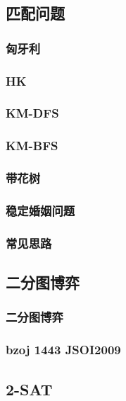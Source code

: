 \documentclass[10pt,a4paper]{article}
\begin{document}
\subsection{匹配问题}
\subsubsection{匈牙利}

\subsubsection{HK}

\subsubsection{KM-DFS}

\subsubsection{KM-BFS}

\subsubsection{带花树}

\subsubsection{稳定婚姻问题}

\subsubsection{常见思路}

\subsection{二分图博弈}
\subsubsection{二分图博弈}

\subsubsection{bzoj 1443 JSOI2009}

\subsection{2-SAT}
\end{document}
